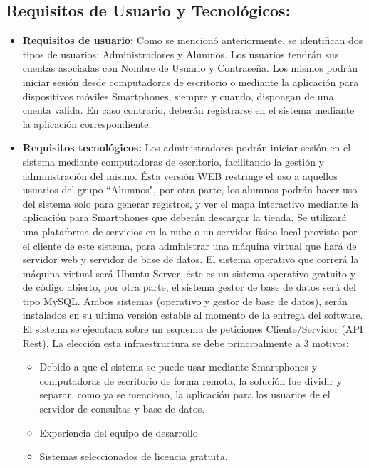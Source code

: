     \subsection{Requisitos de Usuario y Tecnológicos:}
      \begin{itemize}
        \item \textbf{Requisitos de usuario:} Como se mencionó anteriormente, se identifican dos tipos de usuarios: Administradores y Alumnos. Los usuarios tendrán sus cuentas asociadas con Nombre de Usuario y Contraseña. Los mismos podrán iniciar sesión desde computadoras de escritorio o mediante la aplicación para dispositivos móviles Smartphones, siempre y cuando, dispongan de una cuenta valida. En caso contrario, deberán registrarse en el sistema mediante la aplicación correspondiente.

        \item \textbf{Requisitos tecnológicos:} Los administradores podrán iniciar sesión en el sistema mediante computadoras de escritorio, facilitando la gestión y administración del mismo. Ésta versión WEB restringe el uso a aquellos usuarios del grupo ``Alumnos", por otra parte, los alumnos podrán hacer uso del sistema solo para generar registros, y ver el mapa interactivo mediante la aplicación para Smartphones que deberán descargar la tienda.
        Se utilizará una plataforma de servicios en la nube o un servidor físico local provisto por el cliente de este sistema, para administrar una máquina virtual que hará de servidor web y servidor de base de datos. El sistema operativo que correrá la máquina virtual será Ubuntu Server, éste es un sistema operativo gratuito y de código abierto, por otra parte, el sistema gestor de base de datos será del tipo MySQL. Ambos sistemas (operativo y gestor de base de datos), serán instalados en su ultima versión estable al momento de la entrega del software.
        El sistema se ejecutara sobre un esquema de peticiones Cliente/Servidor (API Rest). La elección esta infraestructura se debe principalmente a 3 motivos: 
        \begin{itemize}
          \item Debido a que el sistema se puede usar mediante Smartphones y computadoras de escritorio de forma remota, la solución fue dividir y separar, como ya se menciono, la aplicación para los usuarios de el servidor de consultas y base de datos.
          \item Experiencia del equipo de desarrollo 
          \item Sistemas seleccionados de licencia gratuita.
        \end{itemize}
      \end{itemize}


